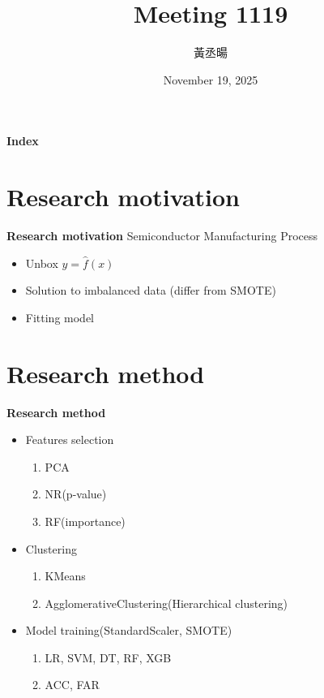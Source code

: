 \documentclass[12pt,aspectratio=43]{beamer}
\title{Meeting 1119}
\author{黃丞暘}
\institute{國立東華大學應數統計所}
\date{November 19, 2025}
\begin{document}
\begin{frame}
  \titlepage
\end{frame}

\begin{frame}{\textbf{Index}}
  \tableofcontents
\end{frame}

\section{Research motivation}

\begin{frame}{\textbf{Research motivation}}
\linespread{1.5}
  Semiconductor Manufacturing Process
  \begin{itemize}
    \item Unbox $y = \hat{f}(x)$
  \end{itemize}
  \begin{itemize}
    \item Solution to imbalanced data (differ from SMOTE)
  \end{itemize}
  \begin{itemize}
    \item Fitting model
  \end{itemize}
\end{frame}

\section{Research method}
\begin{frame}{\textbf{Research method}}
\linespread{1.5}
  \begin{itemize}[]
    \item Features selection
      \begin{enumerate}[]
        \item PCA
        \item NR(p-value)
        \item RF(importance)
      \end{enumerate}
    \item Clustering
      \begin{enumerate}[]
        \item KMeans
        \item AgglomerativeClustering(Hierarchical clustering)
      \end{enumerate}
    \item Model training(StandardScaler, SMOTE)
      \begin{enumerate}
        \item LR, SVM, DT, RF, XGB
        \item ACC, FAR
      \end{enumerate}
  \end{itemize}
\end{frame}
\end{document}
